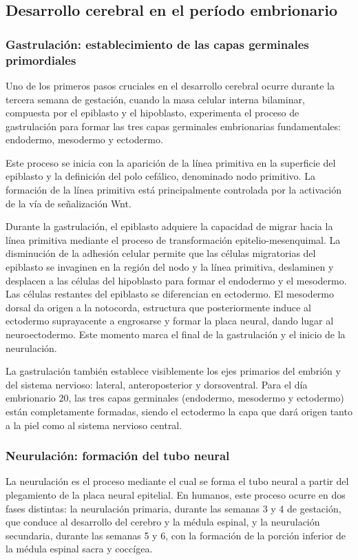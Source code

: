 \documentclass[11pt,letterpaper]{report}
\begin{document}
\subsection{Desarrollo cerebral en el período embrionario}
\subsubsection{Gastrulación: establecimiento de las capas germinales primordiales}
Uno de los primeros pasos cruciales en el desarrollo cerebral ocurre durante la
tercera semana de gestación, cuando la masa celular interna bilaminar,
compuesta por el epiblasto y el hipoblasto, experimenta el proceso de
gastrulación para formar las tres capas germinales embrionarias fundamentales:
endodermo, mesodermo y ectodermo. \cite{Polin124}

Este proceso se inicia con la aparición de la línea primitiva en la superficie
del epiblasto y la definición del polo cefálico, denominado nodo primitivo. La
formación de la línea primitiva está principalmente controlada por la
activación de la vía de señalización Wnt. \cite{MooreEmbryo4}

Durante la gastrulación, el epiblasto adquiere la capacidad de migrar hacia la
línea primitiva mediante el proceso de transformación epitelio-mesenquimal. La
disminución de la adhesión celular permite que las células migratorias del
epiblasto se invaginen en la región del nodo y la línea primitiva, deslaminen
y desplacen a las células del hipoblasto para formar el endodermo y el
mesodermo. Las células restantes del epiblasto se diferencian en ectodermo. El
mesodermo dorsal da origen a la notocorda, estructura que posteriormente induce
al ectodermo suprayacente a engrosarse y formar la placa neural, dando lugar al
neuroectodermo. Este momento marca el final de la gastrulación y el inicio de
la neurulación. \cite{Polin124}

La gastrulación también establece visiblemente los ejes primarios del embrión y
del sistema nervioso: lateral, anteroposterior y dorsoventral. Para el día
embrionario 20, las tres capas germinales (endodermo, mesodermo y ectodermo)
están completamente formadas, siendo el ectodermo la capa que dará origen tanto
a la piel como al sistema nervioso central. \cite{Polin124}

\subsubsection{Neurulación: formación del tubo neural}
La neurulación es el proceso mediante el cual se forma el tubo neural a partir
del plegamiento de la placa neural epitelial. En humanos, este proceso ocurre
en dos fases distintas: la neurulación primaria, durante las semanas 3 y 4 de
gestación, que conduce al desarrollo del cerebro y la médula espinal, y la
neurulación secundaria, durante las semanas 5 y 6, con la formación de la
porción inferior de la médula espinal sacra y coccígea. \cite{Polin124}
\end{document}
